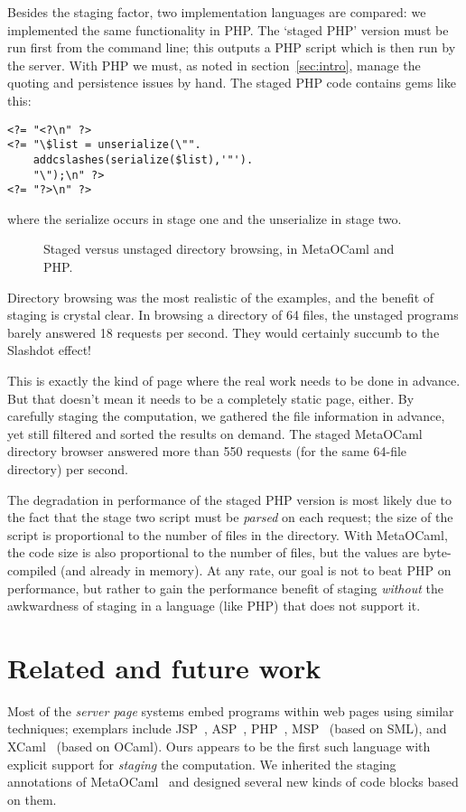 \documentclass[preprint]{acm_proc_article-sp}
\def\MOC{MetaOCaml\xspace}
\newcommand{\myfig}[3]{%
  \begin{figure}[tbp]%
    #3%
    \caption{#2}%
    \label{fig:#1}%
  \end{figure}}
\newcommand{\gnuplot}[2]{%
  \myfig{#1}{#2}{}}
\begin{document}
Besides the staging factor, two implementation languages are compared:
we implemented the same functionality in PHP.  The `staged PHP' version must
be run first from the command line; this outputs a PHP script
which is then run by the server.  With PHP we must, as noted in
section~\ref{sec:intro}, manage the quoting and persistence issues
by hand.  The staged PHP code contains gems like this:
\begin{verbatim}
<?= "<?\n" ?>
<?= "\$list = unserialize(\"".
    addcslashes(serialize($list),'"').
    "\");\n" ?>
<?= "?>\n" ?>
\end{verbatim}
where the serialize occurs in stage one and the unserialize in stage two.

\gnuplot{browse}{Staged versus unstaged directory browsing, in \MOC
  and PHP.}

Directory browsing was the most realistic of the examples, and the
benefit of staging is crystal clear.  In browsing a directory of 64
files, the unstaged programs barely answered 18 requests per second.
They would certainly succumb to the Slashdot effect!

This is exactly the kind of page where the real work needs to be done
in advance.  But that doesn't mean it needs to be a completely static
page, either.  By carefully staging the computation, we gathered the
file information in advance, yet still filtered and sorted the results
on demand.  The staged \MOC directory browser answered more than 550
requests (for the same 64-file directory) per second.

The degradation in performance of the staged PHP version is most
likely due to the fact that the stage two script must be \emph{parsed}
on each request; the size of the script is proportional to the number
of files in the directory.  With \MOC, the code size is also
proportional to the number of files, but the values are byte-compiled
(and already in memory).  At any rate, our goal is not to beat PHP on
performance, but rather to gain the performance benefit of staging
\emph{without} the awkwardness of staging in a language (like PHP) that
does not support it.

\section{Related and future work}
\label{sec:related}

Most of the \emph{server page} systems embed programs within web pages
using similar techniques; exemplars include JSP~\cite{sun-jsp},
ASP~\cite{microsoft-asp}, PHP~\cite{bakken04php},
MSP~\cite{elsman03web} (based on SML), and XCaml~\cite{baretta04xcaml}
(based on OCaml).  Ours appears to be the first such language with
explicit support for \emph{staging} the computation.  We inherited the
staging annotations of \MOC~\cite{calcagno03meta} and designed several
new kinds of code blocks based on them.
\end{document}
